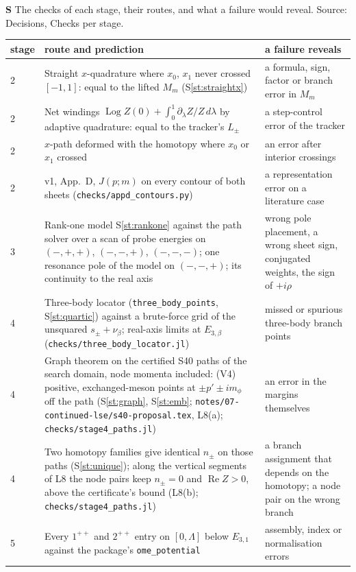 \documentclass[11pt]{article}
\newcommand{\file}[1]{\nolinkurl{#1}}
\newcounter{stmt}
\newenvironment{stmt}[1]{\par\smallskip\refstepcounter{stmt}\noindent\textbf{S\thestmt}\enspace[\textsf{#1}]\enspace\ignorespaces}{\par\smallskip}
\newcommand{\Sr}[1]{S\ref{#1}}
\begin{document}
\begin{stmt}{definition}\label{st:checks}
The checks of each stage, their routes, and what a failure would reveal. Source: Decisions, Checks per stage.
\end{stmt}
\begin{xltabular}{\textwidth}{@{}lLL@{}}
\toprule
stage & route and prediction & a failure reveals\\
\midrule
{} & Straight $x$-quadrature where $x_0$, $x_1$ never crossed $[-1,1]$: equal to the lifted $M_m$ (\Sr{st:straightx}) & a formula, sign, factor or branch error in $M_m$\\
2 & Net windings $\operatorname{Log}Z(0)+\int_0^1\partial_\lambda Z/Z\,d\lambda$ by adaptive quadrature: equal to the tracker's $L_\pm$ & a step-control error of the tracker\\
2 & $x$-path deformed with the homotopy where $x_0$ or $x_1$ crossed & an error after interior crossings\\
2 & \cite{Wu:2026wxb} v1, App.~D, $J(p;m)$ on every contour of both sheets (\file{checks/appd_contours.py}) & a representation error on a literature case\\
3 & Rank-one model \Sr{st:rankone} against the path solver over a scan of probe energies on $(-,+,+)$, $(-,-,+)$, $(-,-,-)$; one resonance pole of the model on $(-,-,+)$; its continuity to the real axis & wrong pole placement, a wrong sheet sign, conjugated weights, the sign of $+i\rho$\\
4 & Three-body locator (\texttt{three\_body\_points}, \Sr{st:quartic}) against a brute-force grid of the unsquared $s_\pm+\nu_\beta$; real-axis limits at $E_{3,\beta}$ (\file{checks/three_body_locator.jl}) & missed or spurious three-body branch points\\
4 & Graph theorem on the certified S40 paths of the search domain, node momenta included: (V4) positive, exchanged-meson points at $\pm p'\pm im_\phi$ off the path (\Sr{st:graph}, \Sr{st:emb}; \file{notes/07-continued-lse/s40-proposal.tex}, L8(a); \file{checks/stage4_paths.jl}) & an error in the margins themselves\\
4 & Two homotopy families give identical $n_\pm$ on those paths (\Sr{st:unique}); along the vertical segments of L8 the node pairs keep $n_\pm=0$ and $\operatorname{Re}Z>0$, above the certificate's bound (L8(b); \file{checks/stage4_paths.jl}) & a branch assignment that depends on the homotopy; a node pair on the wrong branch\\
5 & Every $1^{++}$ and $2^{++}$ entry on $[0,\Lambda]$ below $E_{3,1}$ against the package's \texttt{ome\_potential} & assembly, index or normalisation errors\\

\end{xltabular}
\end{document}
